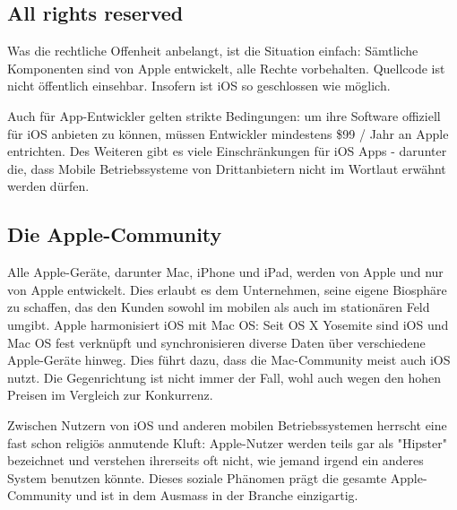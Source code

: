 \subsection{All rights reserved}
Was die rechtliche Offenheit anbelangt, ist die Situation einfach: Sämtliche Komponenten sind von Apple entwickelt, alle Rechte vorbehalten. Quellcode ist nicht öffentlich einsehbar. Insofern ist iOS so geschlossen wie möglich.

Auch für App-Entwickler gelten strikte Bedingungen: um ihre Software offiziell für iOS anbieten zu können, müssen Entwickler mindestens \$99 / Jahr an Apple entrichten. Des Weiteren gibt es viele Einschränkungen für iOS Apps - darunter die, dass Mobile Betriebssysteme von Drittanbietern nicht im Wortlaut erwähnt werden dürfen.

\subsection{Die Apple-Community}
Alle Apple-Geräte, darunter Mac, iPhone und iPad, werden von Apple und nur von Apple entwickelt. Dies erlaubt es dem Unternehmen, seine eigene Biosphäre zu schaffen, das den Kunden sowohl im mobilen als auch im stationären Feld umgibt. Apple harmonisiert iOS mit Mac OS: Seit OS X Yosemite sind iOS und Mac OS fest verknüpft und synchronisieren diverse Daten über verschiedene Apple-Geräte hinweg. Dies führt dazu, dass die Mac-Community meist auch iOS nutzt. Die Gegenrichtung ist nicht immer der Fall, wohl auch wegen den hohen Preisen im Vergleich zur Konkurrenz.

Zwischen Nutzern von iOS und anderen mobilen Betriebssystemen herrscht eine fast schon religiös anmutende Kluft: Apple-Nutzer werden teils gar als "Hipster" bezeichnet und verstehen ihrerseits oft nicht, wie jemand irgend ein anderes System benutzen könnte. Dieses soziale Phänomen prägt die gesamte Apple-Community und ist in dem Ausmass in der Branche einzigartig.